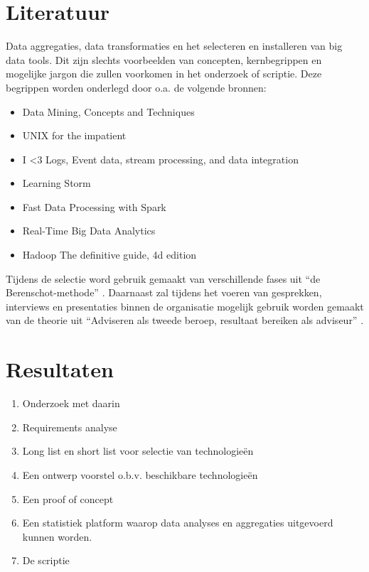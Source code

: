 \section{Literatuur} %

Data aggregaties, data transformaties en het selecteren en installeren van big data tools. Dit zijn slechts voorbeelden van concepten, kernbegrippen en mogelijke jargon die zullen voorkomen in het onderzoek of scriptie. Deze begrippen worden onderlegd door o.a. de volgende bronnen:

\begin{itemize}
    \item Data Mining, Concepts and Techniques \parencite{data-mining}
    \item UNIX for the impatient \parencite{unix}
    \item I <3 Logs, Event data, stream processing, and data integration \parencite{logs}
    \item Learning Storm \parencite{learning-storm}
    \item Fast Data Processing with Spark \parencite{spark}
    \item Real-Time Big Data Analytics \parencite{realtime-architectures}
    \item Hadoop The definitive guide, 4d edition \parencite{hadoop-definitive}
\end{itemize}

Tijdens de selectie word gebruik gemaakt van verschillende fases uit “de Berenschot-methode” \parencite{cuppen}.
Daarnaast zal tijdens het voeren van gesprekken, interviews en presentaties binnen de organisatie mogelijk gebruik worden gemaakt van de theorie uit “Adviseren als tweede beroep, resultaat bereiken als adviseur” \parencite{adviseren}.

\section{Resultaten} %


\begin{enumerate}
    \item Onderzoek met daarin
    \item Requirements analyse
    \item Long list en short list voor selectie van technologieën
    \item Een ontwerp voorstel o.b.v. beschikbare technologieën
    \item Een proof of concept
    \item Een statistiek platform waarop data analyses en aggregaties uitgevoerd kunnen worden.
    \item De scriptie
\end{enumerate}

